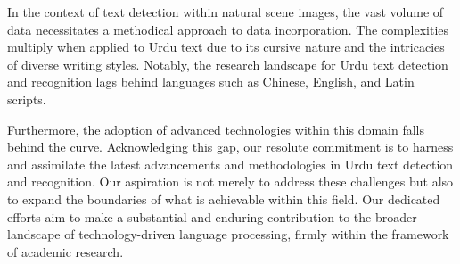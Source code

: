 In the context of text detection within natural scene images, the vast volume of data necessitates a methodical approach to data incorporation. The complexities multiply when applied to Urdu text due to its cursive nature and the intricacies of diverse writing styles. Notably, the research landscape for Urdu text detection and recognition lags behind languages such as Chinese, English, and Latin scripts.

Furthermore, the adoption of advanced technologies within this domain falls behind the curve. Acknowledging this gap, our resolute commitment is to harness and assimilate the latest advancements and methodologies in Urdu text detection and recognition. Our aspiration is not merely to address these challenges but also to expand the boundaries of what is achievable within this field. Our dedicated efforts aim to make a substantial and enduring contribution to the broader landscape of technology-driven language processing, firmly within the framework of academic research.

\pagebreak

